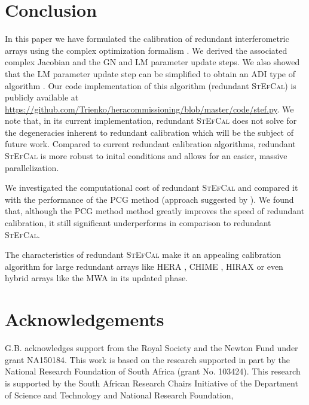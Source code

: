\documentclass[useAMS,usenatbib]{mn2e}
\begin{document}
\section{Conclusion}
\label{sec:conclusions}
In this paper we have formulated the calibration of redundant interferometric arrays using the complex optimization formalism 
\citep{Smirnov2015}. We derived the associated complex Jacobian and the GN and LM parameter update steps.
We also showed that the LM parameter update step can be simplified to obtain an ADI type of algorithm \citep[][]{Salvini2014,Marthi2014}.
Our code implementation of this algorithm (redundant \textsc{StEfCal}) is publicly available at 
\url{https://github.com/Trienko/heracommissioning/blob/master/code/stef.py}. 
We note that, in its current implementation, redundant \textsc{StEfCal} does not solve for the degeneracies inherent to redundant calibration  \citep{Zheng2014,Kurien2016} which will be the subject of future work. Compared to current redundant calibration algorithms, redundant \textsc{StEfCal} is more robust to inital conditions and allows for an easier, massive parallelization. 

We investigated the computational cost of redundant \textsc{StEfCal} and compared it with the performance of the PCG method (approach suggested by \cite{Liu2010}).
We found that, although the PCG method method greatly improves the speed of redundant calibration, it still significant underperforms in comparison to redundant \textsc{StEfCal}.

The characteristics of redundant \textsc{StEfCal} make it an appealing calibration algorithm for large redundant arrays like HERA \citep{deboer2017}, CHIME \citep{Bandura2014}, HIRAX \citep{Newburgh2016} or even hybrid arrays like the MWA \citep{Tingay2013} in its updated phase.

\section*{Acknowledgements}
G.B. acknowledges support from the Royal Society and the Newton Fund under grant NA150184. This work is based on the research supported in part by the National Research Foundation of South Africa (grant No. 103424). This research is supported by the South African Research Chairs Initiative of the Department of Science and Technology and National Research Foundation,





\end{document}
